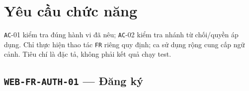 \clearpage
\section{Yêu cầu chức năng}\label{sec:srs-9}
\texttt{AC}-01 kiểm tra đúng hành vi đã nêu; \texttt{AC}-02 kiểm tra nhánh từ chối/\allowbreak{}quyền áp dụng. Chỉ thực hiện thao tác \texttt{FR} riêng quy định; ca sử dụng rộng cung cấp ngữ cảnh. Tiêu chí là đặc tả, không phải kết quả chạy test.

\subsection{\texttt{WEB-\allowbreak{}FR-\allowbreak{}AUTH-\allowbreak{}01} — Đăng ký}
\begingroup
\fontsize{9.5}{12}\selectfont
\setlength{\SRSWidth}{\dimexpr\linewidth-2\tabcolsep\relax}
